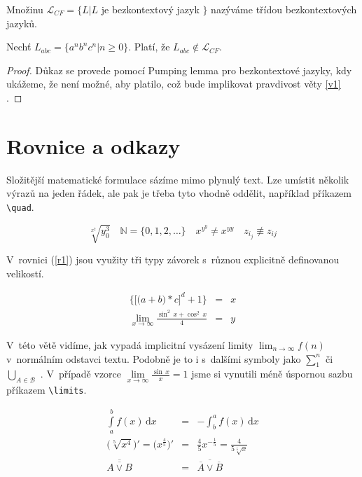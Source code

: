 \documentclass[a4paper, 11pt, twocolumn] {article}
\begin{document}
\begin{definicia}
\textup{Množinu $\mathcal{L}_{CF} = \{L|L$ je bezkontextový jazyk $\}$ nazýváme} třídou bezkontextových jazyků.
\end{definicia}

\begin{veta}
\label{v1}
Nechť $L_{abc} = \{a^nb^nc^n|n \geq 0\}$. Platí, že $L_{abc} \notin  \mathcal{L}_{CF} $.
\end{veta}

\begin{proof}
Důkaz se provede pomocí Pumping lemma pro bezkontextové jazyky, kdy ukážeme, že není možné, aby platilo, což bude implikovat pravdivost věty \ref{v1} .
\end{proof}


\section{Rovnice a odkazy}

Složitější matematické formulace sázíme mimo plynulý text. Lze umístit několik výrazů na jeden řádek, ale pak je třeba tyto vhodně oddělit, například příkazem \verb|\quad|. 

$$\sqrt[x^2]{y^3_0} \quad \mathbb{N} = \{0,1,2,\dots\} \quad x^{y^y} \neq x^{yy} \quad z_{i_j} \not\equiv z_{ij} $$

V~rovnici (\ref{r1}) jsou využity tři typy závorek s~různou explicitně definovanou velikostí.

\begin{eqnarray}
\bigg\{\Big[\big(a+b\big)*c\Big]^d+1\bigg\} & =  & x \label{r1}\\ 
\lim\limits_{x \to \infty}\frac{\sin^2\,{x} + \cos^2\,{x}}{4} & = & y \nonumber
\end{eqnarray}


V~této větě vidíme, jak vypadá implicitní vysázení limity $\lim_{n \to \infty}{f(n)}$ v~normálním odstavci textu. Podobně je to i s~dalšími symboly jako $\sum_{1}^{n}$ či $\bigcup_{A \in \mathcal{B}}$ . V~případě vzorce $\lim\limits_{x \to \infty}{\frac{\sin\,x}{x}}  = 1 $ jsme si vynutili méně úspornou sazbu příkazem \verb|\limits|.

\begin{eqnarray}
\int\limits_a^b f(x)\,\mathrm{d}x & = & -\int_b^a f(x)\, \mathrm{d}x\\
\Big(\sqrt[5]{x^4}\Big)' = \Big(x^{\frac{4}{5}}\Big)' & = & \frac{4}{5}x^{-\frac{1}{5}} = \frac{4}{5\sqrt[5]{x}}\\
\overline{\overline{A \vee B}} & = & \overline{\overline{A} \vee \overline{B}}
\end{eqnarray}
\end{document}
